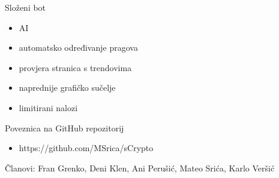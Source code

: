 \documentclass[aspectratio=169,xcolor=dvipsnames]{beamer}
\begin{document}

\begin{frame}{Složeni bot}
    \begin{itemize}
        \item AI
        \item automatsko određivanje pragova
        \item provjera stranica s trendovima
        \item naprednije grafičko sučelje
        \item limitirani nalozi
    \end{itemize}
\end{frame}


\begin{frame}{Poveznica na GitHub repozitorij}
    \begin{itemize}
        \item https://github.com/MSrica/sCrypto\newline
    \end{itemize}
    Članovi: Fran Grenko, Deni Klen, Ani Perušić, Mateo Srića, Karlo Veršić
\end{frame}
\end{document}
